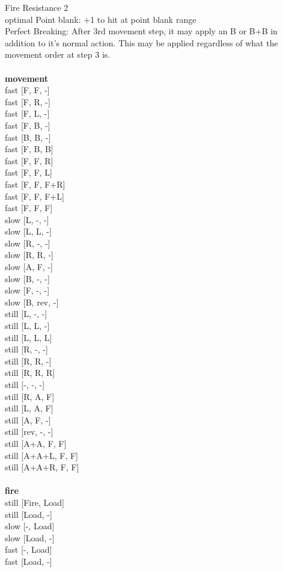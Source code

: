\noindent Fire Resistance 2\\ 
optimal Point blank: +1 to hit at point blank range\\ 
Perfect Breaking: After 3rd movement step, it may apply an B or B+B in addition to it's normal action. This may be applied regardless of what the movement order at step 3 is.\\ 


\ \\ {\bf movement } \\
fast [F, F, -] \\
fast [F, R, -] \\
fast [F, L, -] \\
fast [F, B, -] \\
fast [B, B, -] \\
fast [F, B, B] \\
fast [F, F, R] \\
fast [F, F, L] \\
fast [F, F, F+R] \\
fast [F, F, F+L] \\
fast [F, F, F] \\
slow [L, -, -] \\
slow [L, L, -] \\
slow [R, -, -] \\
slow [R, R, -] \\
slow [A, F, -] \\
slow [B, -, -] \\
slow [F, -, -] \\
slow [B, rev, -] \\
still [L, -, -] \\
still [L, L, -] \\
still [L, L, L] \\
still [R, -, -] \\
still [R, R, -] \\
still [R, R, R] \\
still [-, -, -] \\
still [R, A, F] \\
still [L, A, F] \\
still [A, F, -] \\
still [rev, -, -] \\
still [A+A, F, F] \\
still [A+A+L, F, F] \\
still [A+A+R, F, F] \\
\ \\ {\bf fire } \\
still [Fire, Load] \\
still [Load, -] \\
slow [-, Load] \\
slow [Load, -] \\
fast [-, Load] \\
fast [Load, -] \\


